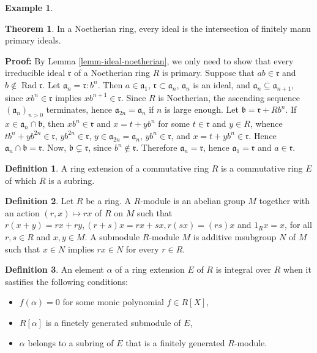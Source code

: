 \documentclass[11pt]{amsbook}%
\newcommand{\ii}{\item}
\theoremstyle{plain}
\theoremstyle{definition}
\newtheorem{definition*}{Definition}
\newtheorem*{example*}{Example}
\newtheorem{theorem}{Theorem}
\numberwithin{equation}{section}
\newcommand{\af}{\mathfrak a}
\newcommand{\bff}{\mathfrak b}
\newcommand{\rf}{\mathfrak r}
\renewcommand{\proof}{ \textbf{Proof: }}
\DeclareMathOperator{\Rad}{Rad}
\begin{document}
\begin{example*}
\begin{theorem}
  In a Noetherian ring, every ideal is the intersection of finitely manu primary ideals.
\end{theorem} \vspace{1.8em}
\proof By Lemma \ref{lemm-ideal-noetherian}, we only need to show that every irreducible ideal $\rf$
of a Noetherian ring $R$ is primary. Suppose that $ab \in \rf$ and $b \notin \Rad \rf$.
Let $\af_{n} = \rf:b^{n}$. Then $a \in \af_{1}$, $\rf \subset \af_{n}$, $\af_{n}$ is an ideal,
and $\af_{n} \subseteq \af_{n+1}$, since $xb^{n} \in \rf$ implies $xb^{n+1} \in \rf$. Since $R$ is Noetherian,
the ascending sequence $(\af_{n})_{n > 0}$ terminates, hence $\af_{2n} = \af_{n}$ if $n$ is large enough.
Let $\bff = \rf + Rb^{n}$. If $x \in \af_{n} \cap \bff$, then $xb^{n} \in \rf$ and $x = t + yb^{n}$ for some
$t \in \rf$ and $y \in R$, whence $tb^{n} + yb^{2n} \in \rf$, $yb^{2n} \in \rf$, $y \in \af_{2n} = \af_{n}$,
$yb^{n} \in \rf$, and $x = t + yb^{n} \in \rf$. Hence $\af_{n} \cap \bff = \rf$.
Now, $\bff \subsetneq \rf$, since $b^{n} \notin \rf$. Therefore $\af_{n} = \rf$, hence
$\af_{1} = \rf$ and $a \in \rf$. \qedsymbol

\begin{definition*}
  \label{eef-ring-extension}
  A ring extension of a commutative ring $R$ is a commutative ring $E$ of which $R$
  is a subring.
\end{definition*}

\begin{definition*}
  \label{def-r-module}
  Let $R$ be a ring. A $R$-module is an abelian group $M$ together
  with an action $(r, x) \longmapsto rx$ of $R$ on $M$ such that
  $r(x + y) = rx + ry, (r + s)x = rx + sx, r(sx) = (rs)x$ and $1_{R}x = x$,
  for all $r, s \in R$ and $x, y \in M$. A submodule $R$-module $M$ is additive
  msubgroup $N$ of $M$ such that $x \in N$ implies $rx \in N$ for every $r \in R$.
\end{definition*}

\begin{definition*}
  An element $\alpha$ of a ring extension $E$ of $R$ is integral over $R$ when it sastifies
  the following conditions:
  \begin{itemize}
    \ii $f(\alpha) = 0$ for some monic polynomial $f \in R[X]$,
    \ii $R[\alpha]$ is a finetely generated submodule of $E$,
    \ii $\alpha$ belongs to a subring of $E$ that is a finitely generated $R$-module.
  \end{itemize}
\end{definition*}


\end{example*}
\end{document}
